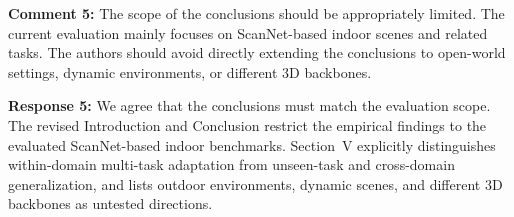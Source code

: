 {\noindent\color{comment}
\textbf{Comment 5:}
The scope of the conclusions should be appropriately limited. The current evaluation mainly focuses on ScanNet-based indoor scenes and related tasks. The authors should avoid directly extending the conclusions to open-world settings, dynamic environments, or different 3D backbones.
}\vspace{\comafter}

\noindent\textbf{Response 5:}
We agree that the conclusions must match the evaluation scope. The revised Introduction and Conclusion restrict the empirical findings to the evaluated ScanNet-based indoor benchmarks. Section~V explicitly distinguishes within-domain multi-task adaptation from unseen-task and cross-domain generalization, and lists outdoor environments, dynamic scenes, and different 3D backbones as untested directions.
\vspace{\resafter}
